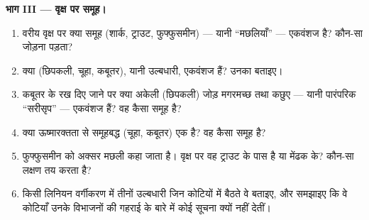 \begin{problem}
\medskip
\noindent\textbf{भाग III --- वृक्ष पर समूह।}
\begin{enumerate}[resume]
  \item वरीय वृक्ष पर क्या समूह (शार्क, ट्राउट, फुफ्फुसमीन)
        --- यानी ``मछलियाँ'' --- एकवंशज है? कौन-सा  जोड़ना पड़ता?
  \item क्या (छिपकली, चूहा, कबूतर), यानी उल्बधारी, एकवंशज हैं? उनका
         बताइए।
  \item कबूतर के रख दिए जाने पर क्या अकेली (छिपकली) जोड़ मगरमच्छ तथा
        कछुए --- यानी पारंपरिक ``सरीसृप'' --- एकवंशज हैं? वह कैसा समूह
        है?
  \item क्या ऊष्मारक्तता से समूहबद्ध (चूहा, कबूतर) एक  है? वह कैसा
        समूह है?
  \item फुफ्फुसमीन को अक्सर मछली कहा जाता है। वृक्ष पर वह ट्राउट के पास
        है या मेंढक के? कौन-सा लक्षण तय करता है?
  \item किसी लिनियन वर्गीकरण में तीनों उल्बधारी जिन कोटियों में बैठते वे
        बताइए, और समझाइए कि वे कोटियाँ उनके विभाजनों की गहराई के बारे
        में कोई सूचना क्यों नहीं देतीं।
\end{enumerate}


\end{problem}
